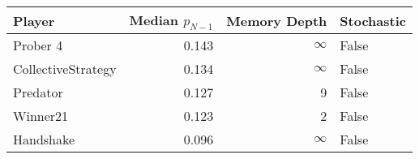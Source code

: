 \begin{tabular}{lrrl}
\toprule
             Player &  Median $p_{N-1}$ &  Memory Depth & Stochastic \\
\midrule
           Prober 4 &             0.143 &            \(\infty\) &      False \\
 CollectiveStrategy &             0.134 &            \(\infty\) &      False \\
           Predator &             0.127 &             9 &      False \\
           Winner21 &             0.123 &             2 &      False \\
          Handshake &             0.096 &            \(\infty\) &      False \\
\bottomrule
\end{tabular}
